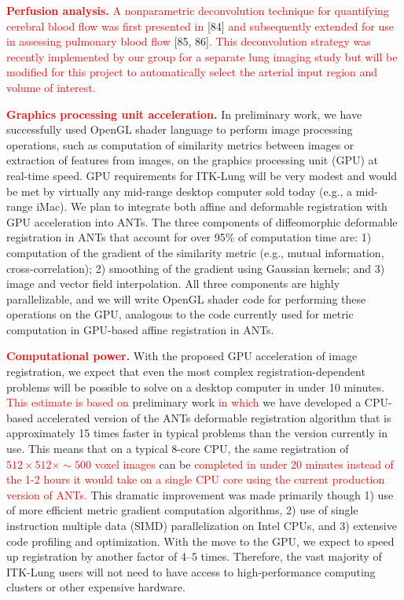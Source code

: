 \documentclass[11pt,]{article}
\begin{document}
\textbf{\textcolor{red}{Perfusion analysis.}}
\textcolor{red}{A nonparametric deconvolution technique for quantifying cerebral blood
flow was first presented in} {[}84{]}
\textcolor{red}{and subsequently extended for use in assessing
pulmonary blood flow} {[}85,
86{]}\textcolor{red}{.  This deconvolution strategy was recently
implemented by our group for a separate lung imaging study but will be modified for this
project to automatically select the arterial input region and volume of interest.}

\textbf{\textcolor{red}{Graphics processing unit acceleration.}} In
preliminary work, we have successfully used OpenGL shader language to
perform image processing operations, such as computation of similarity
metrics between images or extraction of features from images, on the
graphics processing unit (GPU) at real-time speed. GPU requirements for
ITK-Lung will be very modest and would be met by virtually any mid-range
desktop computer sold today (e.g., a mid-range iMac). We plan to
integrate both affine and deformable registration with GPU acceleration
into ANTs. The three components of diffeomorphic deformable registration
in ANTs that account for over 95\% of computation time are: 1)
computation of the gradient of the similarity metric (e.g., mutual
information, cross-correlation); 2) smoothing of the gradient using
Gaussian kernels; and 3) image and vector field interpolation. All three
components are highly parallelizable, and we will write OpenGL shader
code for performing these operations on the GPU, analogous to the code
currently used for metric computation in GPU-based affine registration
in ANTs.

\textbf{\textcolor{red}{Computational power.}} With the proposed GPU
acceleration of image registration, we expect that even the most complex
registration-dependent problems will be possible to solve on a desktop
computer in under 10 minutes. \textcolor{red}{This estimate is based on}
preliminary work \textcolor{red}{in which} we have developed a CPU-based
accelerated version of the ANTs deformable registration algorithm that
is approximately 15 times faster in typical problems than the version
currently in use. This means that on a typical 8-core CPU, the same
registration of
\textcolor{red}{$512 \times 512 \times {\sim}500$ voxel images} can be
\textcolor{red}{completed in under 20 minutes
instead of the 1-2 hours it would take on a single CPU core using the current production version of ANTs.}
This dramatic improvement was made primarily though 1) use of more
efficient metric gradient computation algorithms, 2) use of single
instruction multiple data (SIMD) parallelization on Intel CPUs, and 3)
extensive code profiling and optimization. With the move to the GPU, we
expect to speed up registration by another factor of 4--5 times.
Therefore, the vast majority of ITK-Lung users will not need to have
access to high-performance computing clusters or other expensive
hardware.
\end{document}

